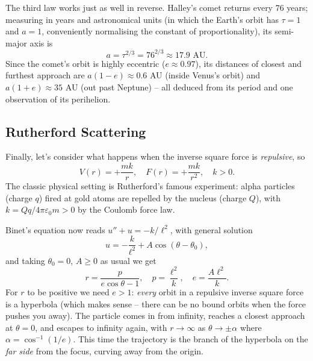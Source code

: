 \begin{example}
	The third law works just as well in reverse. Halley's comet returns every $76$ years; measuring in years and astronomical units (in which the Earth's orbit has $\tau = 1$ and $a = 1$, conveniently normalising the constant of proportionality), its semi-major axis is
	$$
	a = \tau^{2/3} = 76^{2/3} \approx 17.9 \text{ AU}.
	$$
	Since the comet's orbit is highly eccentric ($e \approx 0.97$), its distances of closest and furthest approach are $a(1 - e) \approx 0.6$ AU (inside Venus's orbit) and $a(1 + e) \approx 35$ AU (out past Neptune) -- all deduced from its period and one observation of its perihelion.
\end{example}

\subsection{Rutherford Scattering}

Finally, let's consider what happens when the inverse square force is \emph{repulsive}, so
$$
V(r) = +\frac{mk}{r}, \quad F(r) = +\frac{mk}{r^2}, \quad k > 0.
$$
The classic physical setting is Rutherford's famous experiment: alpha particles (charge $q$) fired at gold atoms are repelled by the nucleus (charge $Q$), with $k = Qq/4\pi\varepsilon_0 m > 0$ by the Coulomb force law.

Binet's equation now reads $u'' + u = -k/\ell^2$, with general solution
$$
u = -\frac{k}{\ell^2} + A \cos(\theta - \theta_0),
$$
and taking $\theta_0 = 0$, $A \geq 0$ as usual we get
$$
r = \frac{p}{e \cos \theta - 1}, \quad p = \frac{\ell^2}{k}, \quad e = \frac{A\ell^2}{k}.
$$
For $r$ to be positive we need $e > 1$: \emph{every} orbit in a repulsive inverse square force is a hyperbola (which makes sense -- there can be no bound orbits when the force pushes you away). The particle comes in from infinity, reaches a closest approach at $\theta = 0$, and escapes to infinity again, with $r \to \infty$ as $\theta \to \pm \alpha$ where $\alpha = \cos^{-1}(1/e)$. This time the trajectory is the branch of the hyperbola on the \emph{far side} from the focus, curving away from the origin.

\begin{center}
\end{center}

